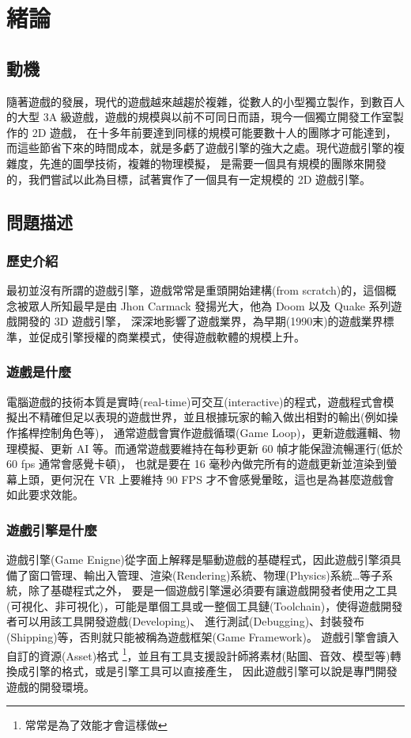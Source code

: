\chapter{緒論}

\section{動機}

隨著遊戲的發展，現代的遊戲越來越趨於複雜，從數人的小型獨立製作，到數百人的大型 3A 級遊戲，遊戲的規模與以前不可同日而語，現今一個獨立開發工作室製作的 2D 遊戲，
在十多年前要達到同樣的規模可能要數十人的團隊才可能達到，而這些節省下來的時間成本，就是多虧了遊戲引擎的強大之處。現代遊戲引擎的複雜度，先進的圖學技術，複雜的物理模擬，
是需要一個具有規模的團隊來開發的，我們嘗試以此為目標，試著實作了一個具有一定規模的 2D 遊戲引擎。

\section{問題描述}

\subsection{歷史介紹}

最初並沒有所謂的遊戲引擎，遊戲常常是重頭開始建構(from scratch)的，這個概念被眾人所知最早是由 Jhon Carmack 發揚光大，他為 Doom 以及 Quake 系列遊戲開發的 3D 遊戲引擎，
深深地影響了遊戲業界，為早期(1990末)的遊戲業界標準，並促成引擎授權的商業模式，使得遊戲軟體的規模上升。

\subsection{遊戲是什麼}
電腦遊戲的技術本質是實時(real-time)可交互(interactive)的程式，遊戲程式會模擬出不精確但足以表現的遊戲世界，並且根據玩家的輸入做出相對的輸出(例如操作搖桿控制角色等)，
通常遊戲會實作遊戲循環(Game Loop)，更新遊戲邏輯、物理模擬、更新 AI 等。而通常遊戲要維持在每秒更新 60 幀才能保證流暢運行(低於 60 fps 通常會感覺卡頓)，
也就是要在 16 毫秒內做完所有的遊戲更新並渲染到螢幕上頭，更何況在 VR 上要維持 90 FPS 才不會感覺暈眩，這也是為甚麼遊戲會如此要求效能。

\subsection{遊戲引擎是什麼}

遊戲引擎(Game Enigne)從字面上解釋是驅動遊戲的基礎程式，因此遊戲引擎須具備了窗口管理、輸出入管理、渲染(Rendering)系統、物理(Physics)系統…等子系統，除了基礎程式之外，
要是一個遊戲引擎還必須要有讓遊戲開發者使用之工具(可視化、非可視化)，可能是單個工具或一整個工具鏈(Toolchain)，使得遊戲開發者可以用該工具開發遊戲(Developing)、
進行測試(Debugging)、封裝發布(Shipping)等，否則就只能被稱為遊戲框架(Game Framework)。
遊戲引擎會讀入自訂的資源(Asset)格式 \footnote{常常是為了效能才會這樣做}，並且有工具支援設計師將素材(貼圖、音效、模型等)轉換成引擎的格式，或是引擎工具可以直接產生，
因此遊戲引擎可以說是專門開發遊戲的開發環境。

